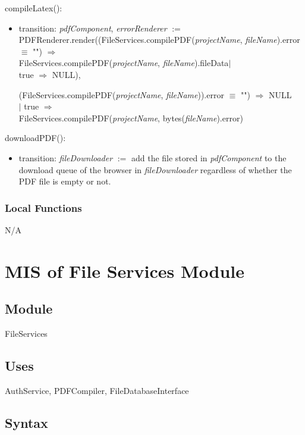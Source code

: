 \documentclass[12pt, titlepage]{article}
\begin{document}
	\noindent compileLatex():
	\begin{itemize}
		\item transition: \textit{pdfComponent}, \textit{errorRenderer} $:=$ \\
		PDFRenderer.render((FileServices.compilePDF(\textit{projectName}, \textit{fileName}).error $\equiv$ "") $\Rightarrow$\\
		FileServices.compilePDF(\textit{projectName}, \textit{fileName}).fileData$|$\\
		true $\Rightarrow$ NULL), 
		
		(FileServices.compilePDF(\textit{projectName}, \textit{fileName})).error $\equiv$ "") $\Rightarrow$ NULL\\
		$|$ true $\Rightarrow$\\
		FileServices.compilePDF(\textit{projectName}, bytes(\textit{fileName}).error)
	\end{itemize}
	
	\noindent downloadPDF():
	\begin{itemize}
		\item transition: \textit{fileDownloader} $:=$ add the file stored in \textit{pdfComponent} to the download queue of the browser in \textit{fileDownloader} regardless of whether the PDF file is empty or not.
	\end{itemize}
	
	\subsubsection{Local Functions}
	
	N/A
	
	\newpage
	
	\section{MIS of File Services Module} \label{Module}
	
	\subsection{Module}
	
	FileServices
	
	\subsection{Uses}
	
	AuthService, PDFCompiler, FileDatabaseInterface
	
	\subsection{Syntax}
	
\end{document}
